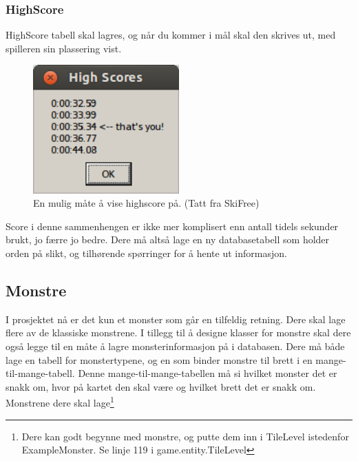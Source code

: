 \documentclass[norsk]{article}
\begin{document}
\subsubsection{HighScore}
\label{subsec:highscore}
HighScore tabell skal lagres, og når du kommer i mål skal den skrives ut, med spilleren sin plassering vist.
\begin{figure}[h!]
  \caption{En mulig måte å vise highscore på. (Tatt fra SkiFree)}
  \centering
    \includegraphics[width=0.5\textwidth]{Mulig-HighScore.png}
\end{figure}

Score i denne sammenhengen er ikke mer komplisert enn antall tidels sekunder brukt, jo færre jo bedre.
Dere må altså lage en ny databasetabell som holder orden på slikt, og tilhørende spørringer for å hente ut informasjon.

\subsection{Monstre}
\label{subsec:monster}
I prosjektet nå er det kun et monster som går en tilfeldig retning. Dere skal lage flere av de klassiske monstrene.
I tillegg til å designe klasser for monstre skal dere også legge til en måte å lagre monsterinformasjon på i databasen.
Dere må både lage en tabell for monstertypene, og en som binder monstre til brett i en mange-til-mange-tabell. Denne mange-til-mange-tabellen må si hvilket monster det er snakk om, hvor på kartet den skal være og hvilket brett det er snakk om.
Monstrene dere skal lage\footnote{Dere kan godt begynne med monstre, og putte dem inn i TileLevel istedenfor ExampleMonster. Se linje 119 i game.entity.TileLevel}\\
\end{document}
